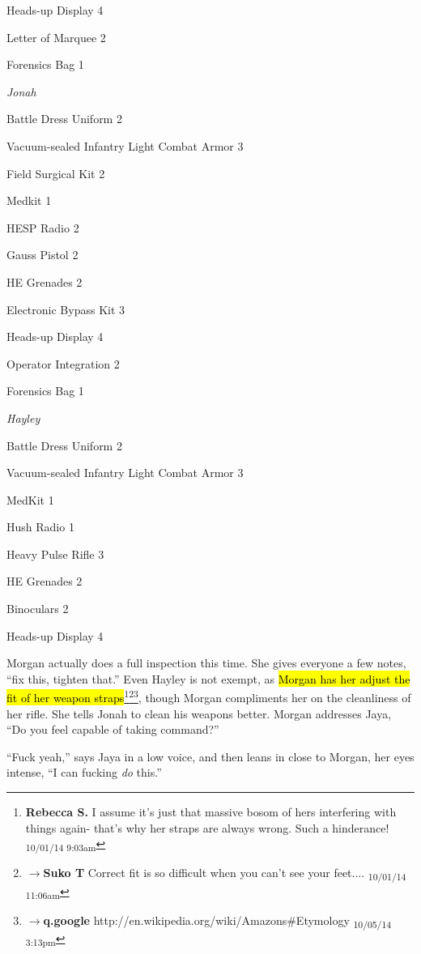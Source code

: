 Heads-up Display 4

Letter of Marquee 2

Forensics Bag 1



\textit{Jonah}

Battle Dress Uniform 2

Vacuum-sealed Infantry Light Combat Armor 3

Field Surgical Kit 2

Medkit 1

HESP Radio 2

Gauss Pistol 2

HE Grenades 2

Electronic Bypass Kit 3

Heads-up Display 4

Operator Integration 2

Forensics Bag 1



\textit{Hayley}

Battle Dress Uniform 2

Vacuum-sealed Infantry Light Combat Armor 3

MedKit 1

Hush Radio 1

Heavy Pulse Rifle 3

HE Grenades 2

Binoculars 2

Heads-up Display 4



Morgan actually does a full inspection this time.  She gives everyone a few notes, ``fix this, tighten that.'' Even Hayley is not exempt, as \hl{Morgan has her adjust the fit of her weapon straps}\footnote{\textbf{Rebecca S. }I assume it's just that massive bosom of hers interfering with things again- that's why her straps are always wrong. Such a hinderance! \textsubscript{10/01/14 9:03am}}\footnote{$\rightarrow$\textbf{Suko T }Correct fit is so difficult when you can't see your feet.... \textsubscript{10/01/14 11:06am}}\footnote{$\rightarrow$\textbf{q.google }http://en.wikipedia.org/wiki/Amazons\#Etymology \textsubscript{10/05/14 3:13pm}}, though Morgan compliments her on the cleanliness of her rifle.  She tells Jonah to clean his weapons better.   Morgan addresses Jaya, ``Do you feel capable of taking command?''

``Fuck yeah,'' says Jaya in a low voice, and then leans in close to Morgan, her eyes intense, ``I can fucking \textit{do} this.''

